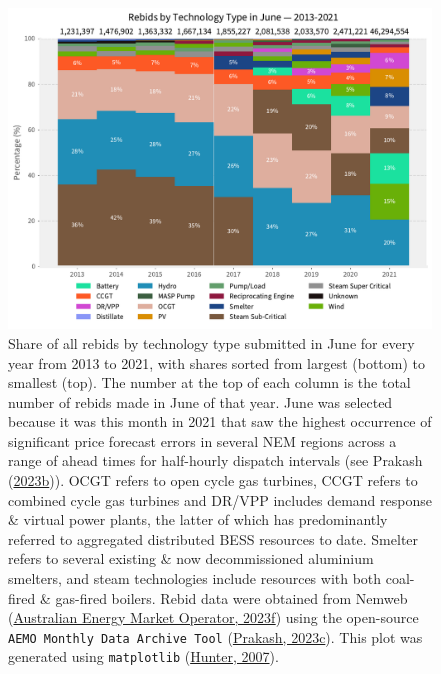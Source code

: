 \documentclass[12pt,a4paper,]{report}
\begin{document}
\begin{figure}
\hypertarget{fig:share_rebids_june_2013_2021}{%
\centering
\includegraphics{source/figures/rebids_june_share_by_tech_2013_2021.pdf}
\caption{Share of all rebids by technology type submitted in June for
every year from 2013 to 2021, with shares sorted from largest (bottom)
to smallest (top). The number at the top of each column is the total
number of rebids made in June of that year. June was selected because it
was this month in 2021 that saw the highest occurrence of significant
price forecast errors in several NEM regions across a range of ahead
times for half-hourly dispatch intervals (see Prakash
(\protect\hyperlink{ref-prakashEnergyPriceConvergence2023}{2023b})).
OCGT refers to open cycle gas turbines, CCGT refers to combined cycle
gas turbines and DR/VPP includes demand response \& virtual power
plants, the latter of which has predominantly referred to aggregated
distributed BESS resources to date. Smelter refers to several existing
\& now decommissioned aluminium smelters, and steam technologies include
resources with both coal-fired \& gas-fired boilers. Rebid data were
obtained from Nemweb
(\protect\hyperlink{ref-australianenergymarketoperatorNemwebMarketData2023}{Australian
Energy Market Operator, 2023f}) using the open-source
\texttt{AEMO\ Monthly\ Data\ Archive\ Tool}
(\protect\hyperlink{ref-prakashAEMOMonthlyData2023}{Prakash, 2023c}).
This plot was generated using \texttt{matplotlib}
(\protect\hyperlink{ref-hunterMatplotlib2DGraphics2007}{Hunter,
2007}).}\label{fig:share_rebids_june_2013_2021}
}
\end{figure}
\end{document}
